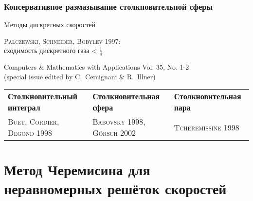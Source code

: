 \documentclass[mathserif]{beamer} %
\newcommand{\Cite}[2][]{\alert{\textsc{#2 #1}}}
\begin{document}
\begin{frame}
    \frametitle{Консервативное размазывание столкновительной сферы}
    \centering
    {\Large Mетоды дискретных скоростей}\vspace{10pt}

    \Cite[1997]{Palczewski, Schneider, Bobylev}:\\
        сходимость дискретного газа < \(\frac14\) %
    \vspace{10pt}
    \setlength{\leftmarginii}{10pt}
    \setlength{\leftmarginiii}{\leftmarginii}
    \begin{adjustwidth}{-2.5em}{-2.5em}
    \centering
    Computers \& Mathematics with Applications Vol. 35, No. 1-2\\
    (special issue edited by C.~Cercignani \& R.~Illner) %

    \newcommand{\ColW}{}
    \begin{tabular}{>{\centering\arraybackslash}p{\ColW}>{\centering\arraybackslash}p{\ColW}>{\centering\arraybackslash}p{\ColW}}
		\centering\bfseries Столкновительный интеграл &
		\centering\bfseries Столкновительная сфера &
		{\centering\bfseries Столкновительная пара} \\
		\Cite[1998]{Buet, Cordier, Degond} &
		\Cite[1998]{Babovsky}, \Cite[2002]{G\"orsch} &
		\Cite[1998]{Tcheremissine} \\
	\end{tabular}
    \end{adjustwidth}
\end{frame}

\section{Метод Черемисина для неравномерных решёток скоростей}
\end{document}
